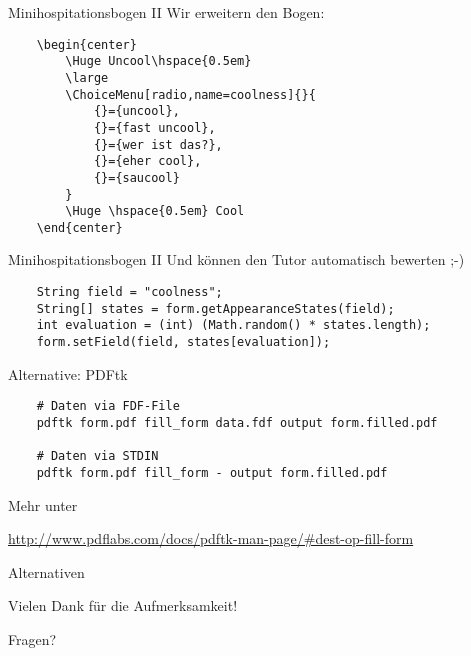 \documentclass{beamer}
\begin{document}
\begin{frame}[fragile]{Minihospitationsbogen II}
Wir erweitern den Bogen:
\begin{verbatim}
	\begin{center}
	    \Huge Uncool\hspace{0.5em}
	    \large
	    \ChoiceMenu[radio,name=coolness]{}{
	        {}={uncool},
	        {}={fast uncool},
	        {}={wer ist das?},
	        {}={eher cool},
	        {}={saucool}
	    }
	    \Huge \hspace{0.5em} Cool
	\end{center}
\end{verbatim}
\end{frame}


\begin{frame}[fragile]{Minihospitationsbogen II}
Und können den Tutor automatisch bewerten ;-)

\begin{verbatim}
	String field = "coolness";
	String[] states = form.getAppearanceStates(field);
	int evaluation = (int) (Math.random() * states.length);
	form.setField(field, states[evaluation]);
\end{verbatim}
\end{frame}

\begin{frame}[fragile]{Alternative: PDFtk}

\begin{verbatim}
	# Daten via FDF-File
	pdftk form.pdf fill_form data.fdf output form.filled.pdf

	# Daten via STDIN
	pdftk form.pdf fill_form - output form.filled.pdf
\end{verbatim}

\bigskip

Mehr unter
\begin{center}
	\url{http://www.pdflabs.com/docs/pdftk-man-page/#dest-op-fill-form}
\end{center}

\end{frame}

\begin{frame}[fragile]{Alternativen}
\begin{center}
\Huge
Vielen Dank für die Aufmerksamkeit!

\bigskip

Fragen?
\end{center}

\end{frame}
\end{document}
